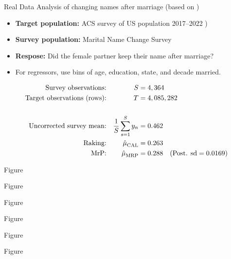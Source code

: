 \begin{frame}{Real Data}
Analysis of changing names after marriage (based on \citet{alexander:2019:namechange})

\begin{itemize}
    \item \textbf{Target population:} ACS survey of US population 2017--2022 \citep{ipumsusa})
    \item \textbf{Survey population:} Marital Name Change Survey \citep{cohen:2019:namechange}
    \item \textbf{Respose:}  Did the female partner keep their name after marriage?
    \item For regressors, use bins of age, education, state, and decade married.
\end{itemize}

$$
\begin{aligned}
    \textrm{Survey observations:} &&  S ={}& 4,364  \\
    \textrm{Target observations (rows):} &&  T ={}& 4,085,282 \\
    \\
    \textrm{Uncorrected survey mean:} && \frac{1}{S} \sum_{s=1}^S y_n ={}& 0.462 \\
    \textrm{Raking:} && \hat{\mu}^{}_{\mathrm{CAL}} ={}& 0.263 \\
    \textrm{MrP:} && \hat{\mu}^{}_{\mathrm{MRP}} ={}& 0.288
        \quad(\textrm{Post. sd} = 0.0169)\\
\end{aligned}
$$
%
\end{frame}


\begin{frame}{Figure}
\AlexanderImbalancePrimary{}
\end{frame}


\begin{frame}{Figure}
\AlexanderImbalanceInteraction{}
\end{frame}


\begin{frame}{Figure}
    \AlexanderPredictionFig{}
\end{frame}



\begin{frame}{Figure}
    \AlexanderPredictionFigTwo{}
\end{frame}




\begin{frame}{Figure}
    \AlexanderPredictionFigThree{}
\end{frame}



\begin{frame}{Figure}
    \AlexanderPredictionFigFour{}
\end{frame}


